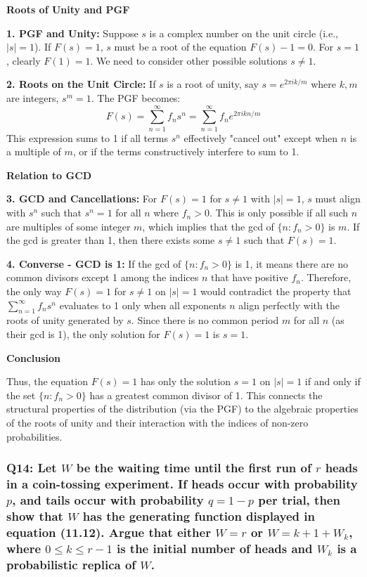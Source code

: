 \documentclass[8pt]{article}
\begin{document}
\textbf{Roots of Unity and PGF}

\textbf{1. PGF and Unity:} Suppose \( s \) is a complex number on the unit circle (i.e., \( |s| = 1 \)). If \( F(s) = 1 \), \( s \) must be a root of the equation \( F(s) - 1 = 0 \). For \( s = 1 \), clearly \( F(1) = 1 \). We need to consider other possible solutions \( s \neq 1 \).

\textbf{2. Roots on the Unit Circle:} If \( s \) is a root of unity, say \( s = e^{2\pi i k/m} \) where \( k, m \) are integers, \( s^m = 1 \). The PGF becomes:
   \[
   F(s) = \sum_{n=1}^\infty f_n s^n = \sum_{n=1}^\infty f_n e^{2\pi i kn/m}
   \]
   This expression sums to 1 if all terms \( s^n \) effectively "cancel out" except when \( n \) is a multiple of \( m \), or if the terms constructively interfere to sum to 1.

\textbf{Relation to GCD}

\textbf{3. GCD and Cancellations:} For \( F(s) = 1 \) for \( s \neq 1 \) with \( |s| = 1 \), \( s \) must align with \( s^n \) such that \( s^n = 1 \) for all \( n \) where \( f_n > 0 \). This is only possible if all such \( n \) are multiples of some integer \( m \), which implies that the gcd of \( \{ n : f_n > 0 \} \) is \( m \). If the gcd is greater than 1, then there exists some \( s \neq 1 \) such that \( F(s) = 1 \).

\textbf{4. Converse - GCD is 1:} If the gcd of \( \{ n : f_n > 0 \} \) is 1, it means there are no common divisors except 1 among the indices \( n \) that have positive \( f_n \). Therefore, the only way \( F(s) = 1 \) for \( s \neq 1 \) on \( |s| = 1 \) would contradict the property that \( \sum_{n=1}^\infty f_n s^n \) evaluates to 1 only when all exponents \( n \) align perfectly with the roots of unity generated by \( s \). Since there is no common period \( m \) for all \( n \) (as their gcd is 1), the only solution for \( F(s) = 1 \) is \( s = 1 \).

\textbf{Conclusion}

Thus, the equation \( F(s) = 1 \) has only the solution \( s = 1 \) on \( |s| = 1 \) if and only if the set \( \{ n : f_n > 0 \} \) has a greatest common divisor of 1. This connects the structural properties of the distribution (via the PGF) to the algebraic properties of the roots of unity and their interaction with the indices of non-zero probabilities.

\subsubsection*{Q14:
Let \(W\) be the waiting time until the first run of \(r\) heads in a coin-tossing experiment. If heads occur with probability \(p\), and tails occur with probability \(q = 1 - p\) per trial, then show that \(W\) has the generating function displayed in equation (11.12). Argue that either \(W = r\) or \(W = k + 1 + W_k\), where \(0 \leq k \leq r - 1\) is the initial number of heads and \(W_k\) is a probabilistic replica of \(W\).}
\end{document}

